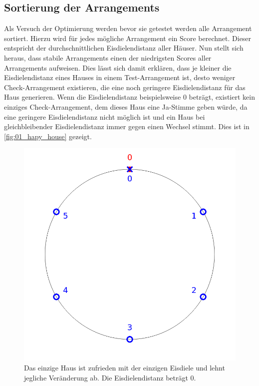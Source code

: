 \documentclass[a4paper,10pt,ngerman]{scrartcl}
\newcommand{\imageWidth}{0.3\linewidth}
\begin{document}
\subsection{Sortierung der Arrangements}
\label{sec:Sortierung_der_Arrangements}
Als Versuch der Optimierung werden bevor sie getestet werden alle Arrangement sortiert.
Hierzu wird für jedes mögliche Arrangement ein Score berechnet.
Dieser entspricht der durchschnittlichen Eisdielendistanz aller Häuser.
Nun stellt sich heraus, dass stabile Arrangements einen der niedrigsten Scores aller Arrangements aufweisen.
Dies lässt sich damit erklären, dass je kleiner die Eisdielendistanz eines Hauses in einem Test-Arrangement ist, desto weniger Check-Arrangement existieren, die eine noch geringere Eisdielendistanz für das Haus generieren.
Wenn die Eisdielendistanz beispielsweise $0$ beträgt, existiert kein einziges Check-Arrangement, dem dieses Haus eine Ja-Stimme geben würde, da eine geringere Eisdielendistanz nicht möglich ist und ein Haus bei gleichbleibender Eisdielendistanz immer gegen einen Wechsel stimmt.
Dies ist in \autoref{fig:01_hapy_house} gezeigt.
\begin{figure}[h!]
    \centering
    \caption{Das einzige Haus ist zufrieden mit der einzigen Eisdiele und lehnt jegliche Veränderung ab. Die Eisdielendistanz beträgt $0$.}
    \label{fig:01_hapy_house}
    \includegraphics[width=\imageWidth]{01_happy_house.png}
\end{figure}
\end{document}
